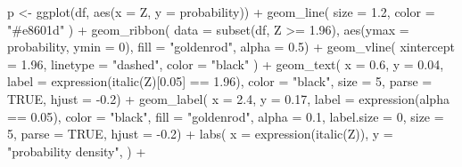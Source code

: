 \documentclass[
  b5paper,
  DIV=11,
  numbers=noendperiod]{scrreprt}
\newenvironment{Shaded}{\begin{snugshade}}{\end{snugshade}}
\newcommand{\AttributeTok}[1]{\textcolor[rgb]{0.40,0.45,0.13}{#1}}
\newcommand{\ConstantTok}[1]{\textcolor[rgb]{0.56,0.35,0.01}{#1}}
\newcommand{\DecValTok}[1]{\textcolor[rgb]{0.68,0.00,0.00}{#1}}
\newcommand{\FloatTok}[1]{\textcolor[rgb]{0.68,0.00,0.00}{#1}}
\newcommand{\FunctionTok}[1]{\textcolor[rgb]{0.28,0.35,0.67}{#1}}
\newcommand{\NormalTok}[1]{\textcolor[rgb]{0.00,0.23,0.31}{#1}}
\newcommand{\OtherTok}[1]{\textcolor[rgb]{0.00,0.23,0.31}{#1}}
\newcommand{\SpecialCharTok}[1]{\textcolor[rgb]{0.37,0.37,0.37}{#1}}
\newcommand{\StringTok}[1]{\textcolor[rgb]{0.13,0.47,0.30}{#1}}
\theoremstyle{definition}
\theoremstyle{remark}
\begin{document}
\begin{Shaded}
\begin{Highlighting}[]
\NormalTok{p }\OtherTok{\textless{}{-}} \FunctionTok{ggplot}\NormalTok{(df, }\FunctionTok{aes}\NormalTok{(}\AttributeTok{x =}\NormalTok{ Z, }\AttributeTok{y =}\NormalTok{ probability)) }\SpecialCharTok{+}
  \FunctionTok{geom\_line}\NormalTok{(}
    \AttributeTok{size =} \FloatTok{1.2}\NormalTok{,}
    \AttributeTok{color =} \StringTok{"\#e8601d"}
\NormalTok{    ) }\SpecialCharTok{+}
  \FunctionTok{geom\_ribbon}\NormalTok{(}
    \AttributeTok{data =} \FunctionTok{subset}\NormalTok{(df, Z }\SpecialCharTok{\textgreater{}=} \FloatTok{1.96}\NormalTok{), }
    \FunctionTok{aes}\NormalTok{(}\AttributeTok{ymax =}\NormalTok{ probability, }\AttributeTok{ymin =} \DecValTok{0}\NormalTok{), }
    \AttributeTok{fill =} \StringTok{"goldenrod"}\NormalTok{, }
    \AttributeTok{alpha =} \FloatTok{0.5}\NormalTok{) }\SpecialCharTok{+}
  \FunctionTok{geom\_vline}\NormalTok{(}
    \AttributeTok{xintercept =} \FloatTok{1.96}\NormalTok{, }
    \AttributeTok{linetype =} \StringTok{"dashed"}\NormalTok{, }
    \AttributeTok{color =} \StringTok{"black"}
\NormalTok{    ) }\SpecialCharTok{+}
  \FunctionTok{geom\_text}\NormalTok{(}
    \AttributeTok{x =} \FloatTok{0.6}\NormalTok{, }\AttributeTok{y =} \FloatTok{0.04}\NormalTok{, }
    \AttributeTok{label =} \FunctionTok{expression}\NormalTok{(}\FunctionTok{italic}\NormalTok{(Z)[}\FloatTok{0.05}\NormalTok{] }\SpecialCharTok{==} \FloatTok{1.96}\NormalTok{), }
    \AttributeTok{color =} \StringTok{"black"}\NormalTok{, }
    \AttributeTok{size =} \DecValTok{5}\NormalTok{,}
    \AttributeTok{parse =} \ConstantTok{TRUE}\NormalTok{, }
    \AttributeTok{hjust =} \SpecialCharTok{{-}}\FloatTok{0.2}\NormalTok{) }\SpecialCharTok{+}
  \FunctionTok{geom\_label}\NormalTok{(}
    \AttributeTok{x =} \FloatTok{2.4}\NormalTok{, }\AttributeTok{y =} \FloatTok{0.17}\NormalTok{, }
    \AttributeTok{label =} \FunctionTok{expression}\NormalTok{(alpha }\SpecialCharTok{==} \FloatTok{0.05}\NormalTok{), }
    \AttributeTok{color =} \StringTok{"black"}\NormalTok{, }
    \AttributeTok{fill =} \StringTok{"goldenrod"}\NormalTok{,}
    \AttributeTok{alpha =} \FloatTok{0.1}\NormalTok{,}
    \AttributeTok{label.size =} \DecValTok{0}\NormalTok{,}
    \AttributeTok{size =} \DecValTok{5}\NormalTok{,}
    \AttributeTok{parse =} \ConstantTok{TRUE}\NormalTok{, }
    \AttributeTok{hjust =} \SpecialCharTok{{-}}\FloatTok{0.2}\NormalTok{) }\SpecialCharTok{+}
  \FunctionTok{labs}\NormalTok{(}
       \AttributeTok{x =} \FunctionTok{expression}\NormalTok{(}\FunctionTok{italic}\NormalTok{(Z)),}
       \AttributeTok{y =} \StringTok{"probability density"}\NormalTok{,}
\NormalTok{       ) }\SpecialCharTok{+}

\end{Highlighting}
\end{Shaded}
\end{document}
